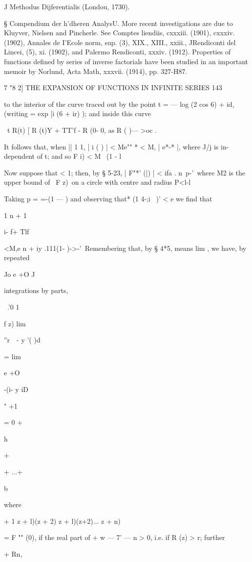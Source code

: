 {J Methodus Dijferentialis (Londou, 1730).

§ Compendium der h'dheren AnalysU. More recent investigations are due
to Kluyver, Nielsen and Pincherle. See Comptes liendiis, cxxxiii.
(1901), cxxxiv. (1902), Annales de I'Ecole norm, sup. (3), XIX.,
XIII., xxiii., JRendiconti del Lincei, (5), xi. (1902), and Palermo
Rendiconti, xxxiv. (1912). Properties of functions defined by series
of inverse factorials have been studied in an important memoir by
Norlund, Acta Math, xxxvii. (1914), pp. 327-H87.

7 "8 2] THE EXPANSION OF FUNCTIONS IN INFINITE SERIES 143

to the interior of the curve traced out by the point t = — log (2 cos
6) + id, (writing = exp [i (6 + ir) ); and inside this curve

\ t R(t) [ R (t)Y + TT'f - R (0- 0, as R ( )— >oc .

It follows that, when || 1 1, | i ( ) | < Me"" * < M, | e*-* |, where
J/j is in- dependent of t; and so F i) < M \ (1 - l

Now suppose that < 1; then, by § 5-23, | F"*' (|) | < ifa . n\ p-'\
where M2 is the upper bound of \ F z)\ on a circle with centre and
radius P<l-l

Taking p = =-(1 — ) and observing that* (1 4-;i~ )' < e we find that

1 n + 1

i- f+ Tlf

<M,e n + iy .111(1- )->-'\ Remembering that, by § 4*5, means lim , we
have, by repeated

Jo e +O J

integrations by parts,

\ .'0 1

f z) lim

''r\ \ - y '( )d

= lim

e +O

-(i- y iD

" +1

= 0 +

h

+

+ ...+

b

where

+ 1 z + l)(z + 2) z + l)(z+2)... z + n)

= F "" (0), if the real part of + w — 7' — n > 0, i.e. if R (z) > r;
further

+ Rn,

}

